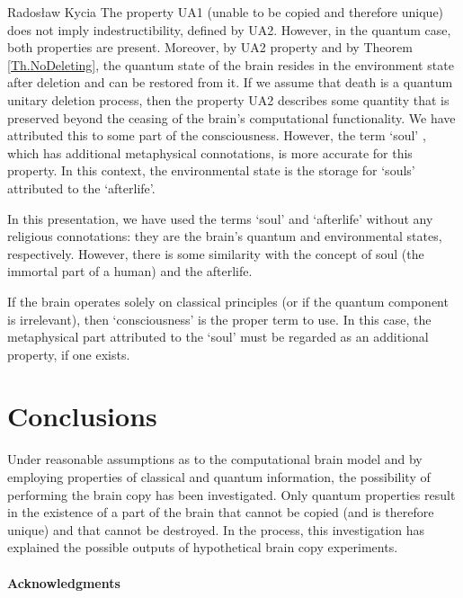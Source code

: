 \begin{artengenv}{Radosław Kycia}
The property UA1 (unable to be copied and therefore unique) does not imply indestructibility, defined by UA2. However, in the quantum case, both properties are present. Moreover, by UA2 property and by Theorem \ref{Th.NoDeleting}, the quantum state of the brain resides in the environment state after deletion and can be restored from it. If we assume that death is a quantum unitary deletion process, then the property UA2 describes some quantity that is preserved beyond the ceasing of the brain's computational functionality. We have attributed this to some part of the consciousness. However, the term `soul' \parencite{Soul}, which has additional metaphysical connotations, is more accurate for this property. In this context, the environmental state is the storage for `souls' attributed to the `afterlife'.

In this presentation, we have used the terms `soul' and `afterlife' without any religious connotations: they are the brain's quantum and environmental states, respectively. However, there is some similarity with the concept of soul (the immortal part of a human) and the afterlife. 


If the brain operates solely on classical principles (or if the quantum component is irrelevant), then `consciousness' is the proper term to use. In this case, the metaphysical part attributed to the `soul' must be regarded as an additional property, if one exists. 





\section{Conclusions}
Under reasonable assumptions as to the computational brain model and by employing properties of classical and quantum information, the possibility of performing the brain copy has been investigated. Only quantum properties result in the existence of a part of the brain that cannot be copied (and is therefore unique) and that cannot be destroyed. In the process, this investigation has explained the possible outputs of hypothetical brain copy experiments.


\paragraph{Acknowledgments}


\end{artengenv}
